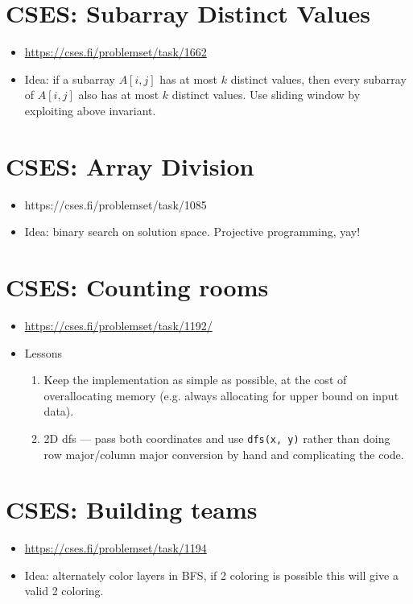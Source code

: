 \documentclass[titlepage, 12pt]{book}
\begin{document}
\section{CSES: Subarray Distinct Values}
\begin{itemize}
    \item\url{https://cses.fi/problemset/task/1662}
    \item Idea: if a subarray $A[i,j]$ has at most $k$ distinct values, then
        every subarray of $A[i, j]$ also has at most $k$ distinct values. Use
        sliding window by exploiting above invariant.
\end{itemize}
\section{CSES: Array Division}
\begin{itemize}
    \item https://cses.fi/problemset/task/1085
    \item Idea: binary search on solution space. Projective programming, yay!
\end{itemize}

\section{CSES: Counting rooms}
\begin{itemize}
  \item\url{https://cses.fi/problemset/task/1192/}
  \item Lessons
    \begin{enumerate}
      \item Keep the implementation as simple as possible, at the cost of
        overallocating memory (e.g. always allocating for upper bound on input
        data).
      \item 2D dfs --- pass both coordinates and use \verb|dfs(x, y)| rather
        than doing row major/column major conversion by hand and complicating the
        code.
    \end{enumerate}
\end{itemize}

\section{CSES: Building teams}
\begin{itemize}
  \item\url{https://cses.fi/problemset/task/1194}
  \item Idea: alternately color layers in BFS, if 2 coloring is possible this
    will give a valid 2 coloring.
\end{itemize}
\end{document}
